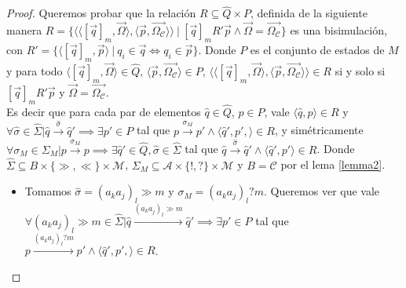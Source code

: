 \begin{proof}
Queremos probar que la relación $R \subseteq \hat{Q} \times P$, definida de la siguiente manera $R = \{ \langle \langle [\overrightarrow{q}]_m, \overrightarrow{\Omega} \rangle, \langle \overrightarrow{p}, \overrightarrow{\Omega_{\mathcal{C}}} \rangle \rangle \ | \ [\overrightarrow{q}]_mR'\overrightarrow{p} \land  \overrightarrow{\Omega}=\overrightarrow{\Omega_{\mathcal{C}}} \}$ es una bisimulación, con $R'=\{\langle [\overrightarrow{q}]_m, \overrightarrow{p} \rangle \ | \ q_i \in \overrightarrow{q} \iff q_i \in \overrightarrow{p} \}$. Donde $P$ es el conjunto de estados de $M$ y para todo $\langle [\overrightarrow{q}]_m, \overrightarrow{\Omega} \rangle \in \hat{Q}$, $\langle \overrightarrow{p}, \overrightarrow{\Omega_{\mathcal{C}}} \rangle \in P$, $\langle \langle [\overrightarrow{q}]_m, \overrightarrow{\Omega} \rangle, \langle \overrightarrow{p}, \overrightarrow{\Omega_{\mathcal{C}}} \rangle \rangle \in R$ si y solo si $[\overrightarrow{q}]_mR'\overrightarrow{p}$ y $\overrightarrow{\Omega}=\overrightarrow{\Omega_{\mathcal{C}}}$. \\

Es decir que para cada par de elementos $\hat{q} \in \hat{Q}$, $p \in P$, vale $\langle \hat{q}, p \rangle \in R$ y $\forall \hat{\sigma} \in \hat{\Sigma} | \hat{q} \xrightarrow{\hat{\sigma}} \hat{q}' \implies \exists p' \in P$ tal que $p \xrightarrow{\sigma_M} p' \land \langle \hat{q}', p', \rangle \in R$, y simétricamente $\forall \sigma_M \in \Sigma_M | p \xrightarrow{\sigma_M} p \implies \exists \hat{q}' \in \hat{Q}, \hat{\sigma} \in \hat{\Sigma}$ tal que $\hat{q} \xrightarrow{\hat{\sigma}} \hat{q}' \land \langle \hat{q}', p'\rangle \in R$. Donde $\hat{\Sigma} \subseteq B \times \{\gg,\ll\} \times \mathcal{M}$, $\Sigma_M \subseteq \mathcal{A} \times \{!,?\} \times \mathcal{M}$ y $B = \mathcal{C}$ por el lema \ref{lemma2}.


\begin{itemize}
    \item[] Tomamos $\hat{\sigma} = (a_ka_j)_l \gg m$ y $\sigma_M = (a_ka_j)_l?m$. Queremos ver que vale $\forall (a_ka_j)_l \gg m \in \hat{\Sigma} | \hat{q} \xrightarrow{(a_ka_j)_l \gg m} \hat{q}' \implies \exists p' \in P$ tal que $p \xrightarrow{(a_ka_j)_l?m} p' \land \langle \hat{q}', p', \rangle \in R$. 
 

\end{itemize}
\end{proof}
